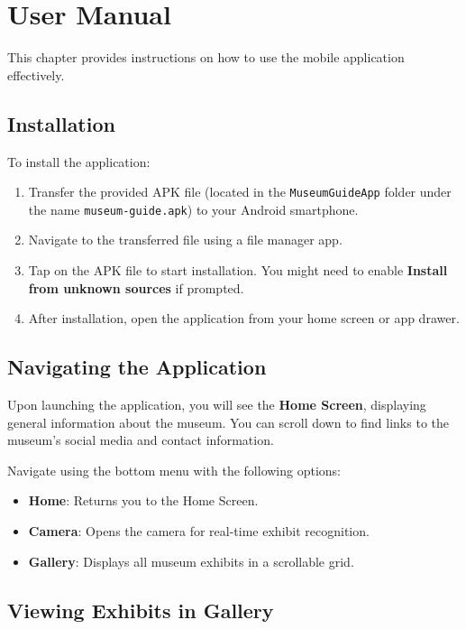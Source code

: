 \chapter{User Manual}

This chapter provides instructions on how to use the mobile application effectively.

\section{Installation}

To install the application:

\begin{enumerate}
\item Transfer the provided APK file (located in the \texttt{MuseumGuideApp} folder under the name \texttt{museum-guide.apk}) to your Android smartphone.
\item Navigate to the transferred file using a file manager app.
\item Tap on the APK file to start installation. You might need to enable \textbf{Install from unknown sources} if prompted.
\item After installation, open the application from your home screen or app drawer.
\end{enumerate}

\section{Navigating the Application}

Upon launching the application, you will see the \textbf{Home Screen}, displaying general information about the museum. You can scroll down to find links to the museum's social media and contact information.

Navigate using the bottom menu with the following options:

\begin{itemize}
\item \textbf{Home}: Returns you to the Home Screen.
\item \textbf{Camera}: Opens the camera for real-time exhibit recognition.
\item \textbf{Gallery}: Displays all museum exhibits in a scrollable grid.
\end{itemize}

\section{Viewing Exhibits in Gallery}

